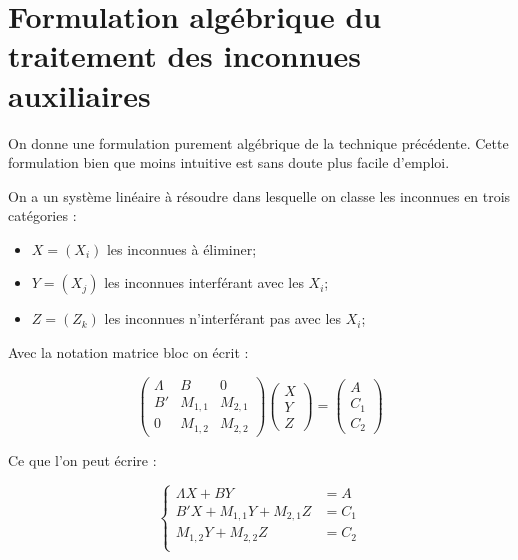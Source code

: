 
\section{Formulation alg\'ebrique du traitement des inconnues auxiliaires}

\label{UnkAux:Algeb}

On donne une formulation purement alg\'ebrique de la technique pr\'ec\'edente.
Cette formulation bien que moins intuitive est sans doute plus facile
d'emploi.

On a un syst\`eme lin\'eaire \`a r\'esoudre dans lesquelle on classe
les inconnues en trois cat\'egories :

\begin{itemize}
   \item    $X=(X_i)$ les inconnues \`a \'eliminer;
   \item    $Y=(X_j)$ les inconnues interf\'erant avec les $X_i$;
   \item    $Z=(Z_k)$ les inconnues n'interf\'erant pas avec les $X_i$;
\end{itemize}

Avec la notation matrice bloc on \'ecrit :

\begin{equation}
 \begin{pmatrix}  \Lambda &  B & 0 \\ 
                 B' &    M_{1,1} & M_{2,1}  \\    
	         0     &  M_{1,2} &  M_{2,2}
  \end{pmatrix}
   \begin{pmatrix} X \\ Y \\ Z \end{pmatrix}
   = \begin{pmatrix} A \\ C_1 \\  C_2 \end{pmatrix}
\end{equation}

Ce que l'on peut \'ecrire :

\begin{equation}
 \begin{cases}  
          \Lambda X + B Y & = A   \\
	    B'X +  M_{1,1}Y +  M_{2,1} Z & = C_1 \\
	           M_{1,2}Y +  M_{2,2} Z & = C_2 \\
  \end{cases}
\end{equation}


